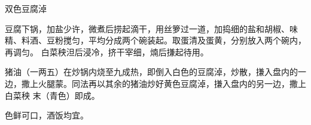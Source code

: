 %
%
%
%
%
%
%
\begin{recipe}[鸳鸯豆腐淖]{双色豆腐淖}

\ingredients


\preparation

\step 豆腐下锅，加盐少许，微煮后捞起滴干，用丝箩过一道，加捣细的盐和胡椒、味
精、料酒、豆粉搅匀，平均分成两个碗装起。取蛋清及蛋黄，分别放入两个碗内，再调匀。
白菜秧泹后浸冷，挤干宰细，煵后搛起待用。

\step 猪油（一两五）在炒锅内烧至九成热，即倒入白色的豆腐淖，炒散，搛入盘内的一
边，撒上火腿蒙。同法再以其余的猪油炒好黄色豆腐淖，搛入盘内的另一边，撒上白菜秧
末（青色）即成。

\features

色鲜可口，酒饭均宜。

\end{recipe}

